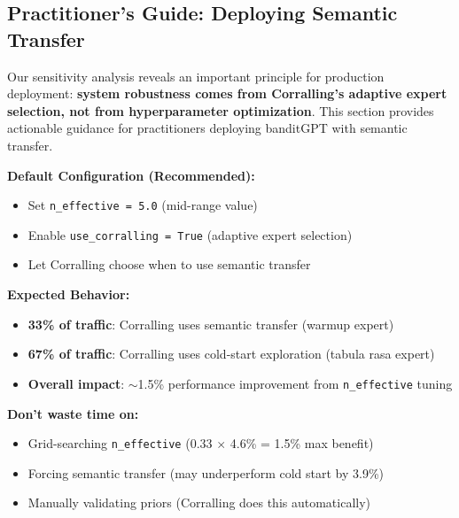 
\subsection{Practitioner's Guide: Deploying Semantic Transfer}
\label{sec:practitioners_guide}

Our sensitivity analysis reveals an important principle for production deployment: \textbf{system robustness comes from Corralling's adaptive expert selection, not from hyperparameter optimization}. This section provides actionable guidance for practitioners deploying banditGPT with semantic transfer.


\begin{tcolorbox}[
    colback=blue!5!white,
    colframe=blue!75!black,
    title=\textbf{Quick Reference: Semantic Transfer Deployment}
]

\textbf{Default Configuration (Recommended):}
\begin{itemize}[leftmargin=*, itemsep=1pt]
    \item Set \texttt{n\_effective = 5.0} (mid-range value)
    \item Enable \texttt{use\_corralling = True} (adaptive expert selection)
    \item Let Corralling choose when to use semantic transfer
\end{itemize}

\textbf{Expected Behavior:}
\begin{itemize}[leftmargin=*, itemsep=1pt]
    \item \textbf{33\% of traffic}: Corralling uses semantic transfer (warmup expert)
    \item \textbf{67\% of traffic}: Corralling uses cold-start exploration (tabula rasa expert)
    \item \textbf{Overall impact}: $\sim$1.5\% performance improvement from \texttt{n\_effective} tuning
\end{itemize}

\textbf{Don't waste time on:}
\begin{itemize}[leftmargin=*, itemsep=1pt]
    \item Grid-searching \texttt{n\_effective} (0.33 $\times$ 4.6\% = 1.5\% max benefit)
    \item Forcing semantic transfer (may underperform cold start by 3.9\%)
    \item Manually validating priors (Corralling does this automatically)
\end{itemize}

\end{tcolorbox}

